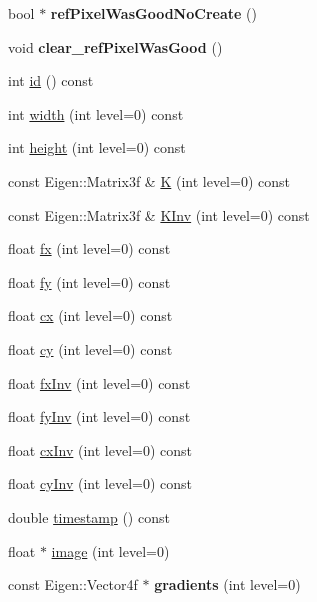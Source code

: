 \begin{DoxyCompactItemize}
\item 
\hypertarget{classlsd__slam_1_1_frame_adb19bd5898e7d6e8ceb9a826096d166e}{bool $\ast$ {\bfseries ref\-Pixel\-Was\-Good\-No\-Create} ()}\label{classlsd__slam_1_1_frame_adb19bd5898e7d6e8ceb9a826096d166e}

\item 
\hypertarget{classlsd__slam_1_1_frame_a89c328ba630444fa4324c2c33b3141f3}{void {\bfseries clear\-\_\-ref\-Pixel\-Was\-Good} ()}\label{classlsd__slam_1_1_frame_a89c328ba630444fa4324c2c33b3141f3}

\item 
int \hyperlink{classlsd__slam_1_1_frame_a6d38d40cd9a68d253bcb3cab2ddfa068}{id} () const 
\item 
int \hyperlink{classlsd__slam_1_1_frame_a3f14a1c43b6cb21d31274f880b0bf36b}{width} (int level=0) const 
\item 
int \hyperlink{classlsd__slam_1_1_frame_a014d19bf6ffba0f0c0b8b684f9afb0b0}{height} (int level=0) const 
\item 
const Eigen\-::\-Matrix3f \& \hyperlink{classlsd__slam_1_1_frame_adeb235dc3e4a4d8fcf622b5771299c31}{K} (int level=0) const 
\item 
const Eigen\-::\-Matrix3f \& \hyperlink{classlsd__slam_1_1_frame_af32c050a1ada7d6c22aa8df04fd94085}{K\-Inv} (int level=0) const 
\item 
float \hyperlink{classlsd__slam_1_1_frame_aaa552f594a3e712b981762719d652359}{fx} (int level=0) const 
\item 
float \hyperlink{classlsd__slam_1_1_frame_af8a9e82339d7f20a380a47d27cdeb01e}{fy} (int level=0) const 
\item 
float \hyperlink{classlsd__slam_1_1_frame_a8d46588a32aa5feb71f771f267dc432d}{cx} (int level=0) const 
\item 
float \hyperlink{classlsd__slam_1_1_frame_a2732f1bad0442085b11f3552a2fd0525}{cy} (int level=0) const 
\item 
float \hyperlink{classlsd__slam_1_1_frame_a9d98889a6a367e862f28b4a035604f46}{fx\-Inv} (int level=0) const 
\item 
float \hyperlink{classlsd__slam_1_1_frame_ab5c98941622d0f0470381a8ed2f833c1}{fy\-Inv} (int level=0) const 
\item 
float \hyperlink{classlsd__slam_1_1_frame_a4690556800b10f98c18a2fada62ae62b}{cx\-Inv} (int level=0) const 
\item 
float \hyperlink{classlsd__slam_1_1_frame_aae9fa687e7e515ba009a5fe5a617bf75}{cy\-Inv} (int level=0) const 
\item 
double \hyperlink{classlsd__slam_1_1_frame_a7124f3e1da6e9db387a3f89706225b47}{timestamp} () const 
\item 
float $\ast$ \hyperlink{classlsd__slam_1_1_frame_a9306307027bbe62b973c0b138216b456}{image} (int level=0)
\item 
\hypertarget{classlsd__slam_1_1_frame_a2c31baa0cea975fb73ccf80d92f7a5de}{const Eigen\-::\-Vector4f $\ast$ {\bfseries gradients} (int level=0)}\label{classlsd__slam_1_1_frame_a2c31baa0cea975fb73ccf80d92f7a5de}


\end{DoxyCompactItemize}
